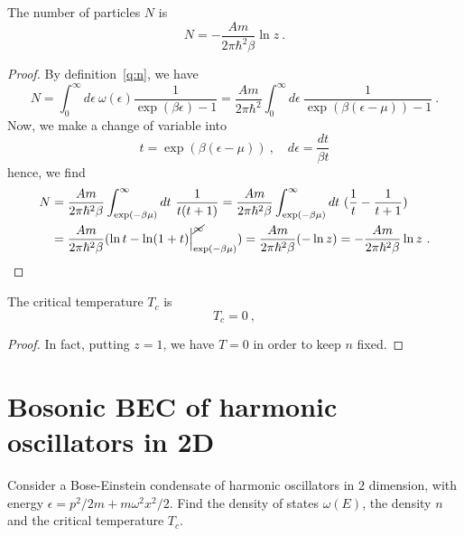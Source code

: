     The number of particles $N$ is 
    \begin{equation*}
        N = -\frac{A m}{2 \pi \hbar^2 \beta} \ln z ~.
    \end{equation*}
    \begin{proof}
        By definition~\eqref{q:n}, we have 
        \begin{equation}
            N = \int_0^\infty d\epsilon ~ \omega(\epsilon) \frac{1}{\exp(\beta \epsilon) - 1} = \frac{A m}{2 \pi \hbar^2} \int_0^\infty d\epsilon ~ \frac{1}{\exp(\beta (\epsilon - \mu)) - 1} ~.
        \end{equation}
        Now, we make a change of variable into 
        \begin{equation}
            t = \exp(\beta (\epsilon - \mu)) ~, \quad d\epsilon = \frac{dt}{\beta t} 
        \end{equation}
        hence, we find 
        \begin{equation*}
        \begin{aligned}
            N & = \frac{A m}{2 \pi \hbar^2 \beta} \int_{\exp(-\beta \mu)}^\infty dt ~ \frac{1}{t (t+1)} = \frac{A m}{2 \pi \hbar^2 \beta} \int_{\exp(-\beta \mu)}^\infty dt ~ (\frac{1}{t} - \frac{1}{t+1} ) \\ & = \frac{A m}{2 \pi \hbar^2 \beta} (\ln t - \ln (1+t) \Big \vert_{\exp(-\beta \mu)}^{\cancel \infty} ) = \frac{A m}{2 \pi \hbar^2 \beta} (- \ln z) = -\frac{A m}{2 \pi \hbar^2 \beta} \ln z ~.
        \end{aligned}
    \end{equation*}
    \end{proof}

    The critical temperature $T_c$ is 
    \begin{equation*}
        T_c = 0 ~,
    \end{equation*}
    \begin{proof}
        In fact, putting $z = 1$, we have $T=0$ in order to keep $n$ fixed.
    \end{proof}

\section{Bosonic BEC of harmonic oscillators in 2D}

    \begin{exercise}
        Consider a Bose-Einstein condensate of harmonic oscillators in $2$ dimension, with energy $\epsilon = p^2 / 2m + m \omega^2 x^2 / 2$.
        Find the density of states $\omega(E)$, the density $n$ and the critical temperature $T_c$.
    \end{exercise}

